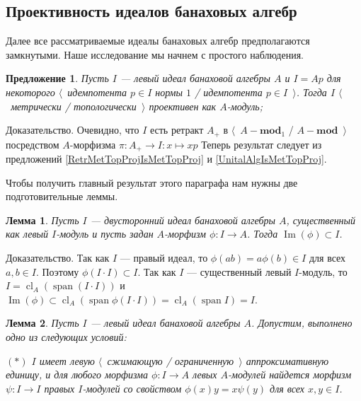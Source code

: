 \documentclass[12pt]{article}
\numberwithin{equation}{subsection}
\theoremstyle{plain}
\newtheorem{lemma}{Лемма}
\newtheorem{proposition}{Предложение}
\newenvironment{proof}{Доказательство.}{}
\begin{document}
\begin{fulltext}
\section{Проективность идеалов банаховых алгебр}
\label{MetricAndTopologicalProjectivityOfIdeals}

Далее все рассматриваемые идеалы банаховых алгебр предполагаются замкнутыми. Наше исследование мы начнем с простого наблюдения.

\begin{proposition}\label{UnIdeallIsMetTopProj}
Пусть $I$ --- левый идеал банаховой алгебры $A$ и $I=Ap$ для некоторого $\langle$~идемпотента $p\in I$ нормы $1$ / идемпотента $p\in I$~$\rangle$. Тогда $I$ $\langle$~метрически / топологически~$\rangle$ проективен как $A$-модуль;
\end{proposition}
\begin{proof} 
Очевидно, что $I$ есть ретракт $A_+$ в $\langle$~$A-\mathbf{mod}_1$ / $A-\mathbf{mod}$~$\rangle$ посредством $A$-морфизма $\pi:A_+\to I:x\mapsto xp$ Теперь результат следует из предложений \ref{RetrMetTopProjIsMetTopProj} и \ref{UnitalAlgIsMetTopProj}.
\end{proof}

Чтобы получить главный результат этого параграфа нам нужны две подготовительные леммы.

\begin{lemma}\label{ImgOfAMorphFromBiIdToA} Пусть $I$ --- двусторонний идеал банаховой алгебры $A$, существенный как левый $I$-модуль и пусть задан $A$-морфизм $\phi:I\to A$. Тогда $\operatorname{Im}(\phi)\subset I$.
\end{lemma}
\begin{proof} Так как $I$ --- правый идеал, то $\phi(ab)=a\phi(b)\in I$ для всех $a,b\in I$. Поэтому $\phi(I\cdot I)\subset I$. Так как $I$ --- существенный левый $I$-модуль, то $I=\operatorname{cl}_A(\operatorname{span}(I\cdot I))$ и $\operatorname{Im}(\phi)\subset\operatorname{cl}_A(\operatorname{span}\phi(I\cdot I))=\operatorname{cl}_A(\operatorname{span}I)=I$.
\end{proof}

\begin{lemma}\label{GoodIdealMetTopProjIsUnital} Пусть $I$ --- левый идеал банаховой алгебры $A$. Допустим, выполнено одно из следующих условий:

$(*)$ $I$ имеет левую $\langle$~сжимающую / ограниченную~$\rangle$ аппроксимативную единицу, и для любого морфизма $\phi:I\to A$ левых $A$-модулей найдется морфизм $\psi:I\to I$ правых $I$-модулей со свойством $\phi(x)y=x\psi(y)$ для всех $x,y\in I$.


\end{lemma}
\end{fulltext}
\end{document}
